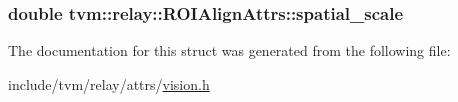 \subsubsection[{\texorpdfstring{spatial\+\_\+scale}{spatial_scale}}]{\setlength{\rightskip}{0pt plus 5cm}double tvm\+::relay\+::\+R\+O\+I\+Align\+Attrs\+::spatial\+\_\+scale}\hypertarget{structtvm_1_1relay_1_1ROIAlignAttrs_a11d752e35f8fdefad7d6243e2b746e19}{}\label{structtvm_1_1relay_1_1ROIAlignAttrs_a11d752e35f8fdefad7d6243e2b746e19}


The documentation for this struct was generated from the following file\+:\begin{DoxyCompactItemize}
\item 
include/tvm/relay/attrs/\hyperlink{vision_8h}{vision.\+h}\end{DoxyCompactItemize}
